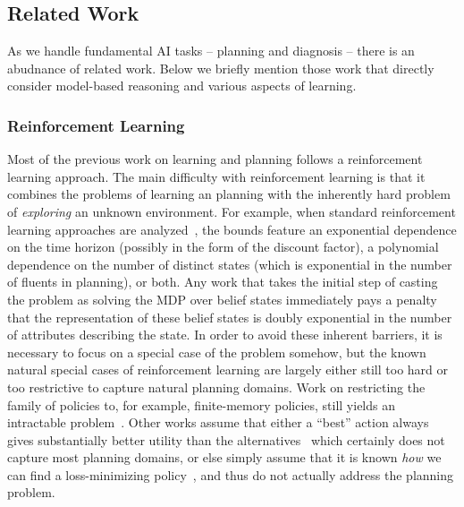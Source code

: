 \documentclass[12pt]{article}
\begin{document}
\subsection{Related Work}
As we handle fundamental AI tasks -- planning and diagnosis -- there is an abudnance of related work. 
Below we briefly mention those work that directly consider model-based reasoning and various aspects of learning. 


\subsubsection{Reinforcement Learning}
\label{reinforcementLearning}
 Most of the previous work on learning and planning follows a reinforcement learning approach. The main difficulty with reinforcement learning is that it combines the problems of learning an planning with the inherently hard problem of {\em exploring} an unknown environment. For example, when standard reinforcement learning approaches are analyzed~\cite{kearns2002POMDPsample,shani2005modelPOMDP}, the bounds feature an exponential dependence on the time horizon (possibly in the form of the discount factor), a polynomial dependence on the number of distinct states (which is exponential in the number of fluents in planning), or both. Any work that takes the initial step of casting the problem as solving the MDP over belief states immediately pays a penalty that the representation of these belief states is doubly exponential in the number of attributes describing the state.  In order to avoid these inherent barriers, it is necessary to focus on a special case of the problem somehow, but the known natural special cases of reinforcement learning are largely either still too hard or too restrictive to capture natural planning domains. Work on restricting the family of policies to, for example, finite-memory policies, still yields an intractable problem~\cite{meuleau1999finitestate}. Other works assume that either a ``best'' action always gives substantially better utility than the alternatives~\cite{fern2006policyIteration} which certainly does not capture most planning domains, or else simply assume that it is known {\em how} we can find a loss-minimizing policy~\cite{lazaric2010policyIteration}, and thus do not actually address the planning problem.
\end{document}
